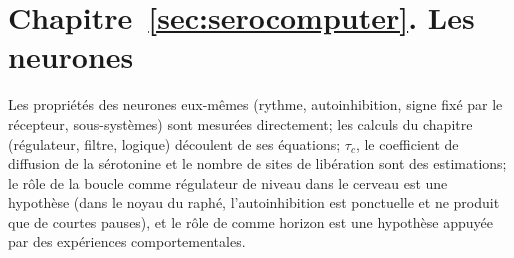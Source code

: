 \section{Chapitre~\ref{sec:serocomputer}. Les neurones }

Les propriétés des neurones  eux-mêmes (rythme, autoinhibition, signe fixé par le récepteur, sous-systèmes) sont mesurées directement; les calculs du chapitre (régulateur, filtre, logique) découlent de ses équations; $\tau_c$, le coefficient de diffusion de la sérotonine et le nombre de sites de libération sont des estimations; le rôle de la boucle comme régulateur de niveau dans le cerveau est une hypothèse (dans le noyau du raphé, l'autoinhibition est ponctuelle et ne produit que de courtes pauses), et le rôle de  comme horizon est une hypothèse appuyée par des expériences comportementales.

